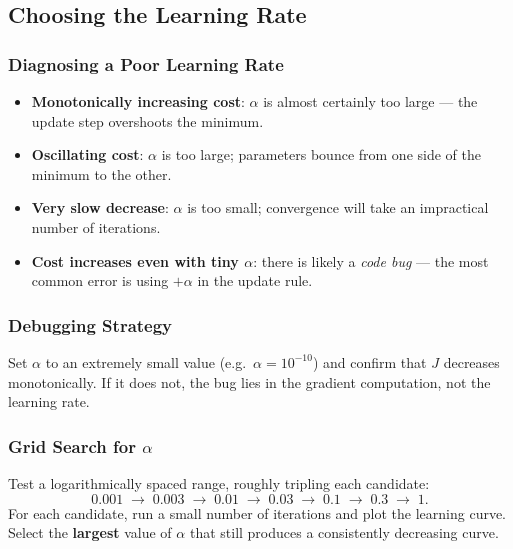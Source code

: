 \subsection{Choosing the Learning Rate}

\subsubsection{Diagnosing a Poor Learning Rate}

\begin{itemize}
\item \textbf{Monotonically increasing cost}: $\alpha$ is almost certainly too
  large — the update step overshoots the minimum.
\item \textbf{Oscillating cost}: $\alpha$ is too large; parameters bounce from
  one side of the minimum to the other.
\item \textbf{Very slow decrease}: $\alpha$ is too small; convergence will take
  an impractical number of iterations.
\item \textbf{Cost increases even with tiny $\alpha$}: there is likely a
  \emph{code bug} — the most common error is using $+\alpha$ in the update rule.
\end{itemize}

\subsubsection{Debugging Strategy}

Set $\alpha$ to an extremely small value (e.g.\ $\alpha=10^{-10}$) and confirm
that $J$ decreases monotonically. If it does not, the bug lies in the gradient
computation, not the learning rate.

\subsubsection{Grid Search for $\alpha$}

Test a logarithmically spaced range, roughly tripling each candidate:
\[
0.001\;\to\;0.003\;\to\;0.01\;\to\;0.03\;\to\;0.1\;\to\;0.3\;\to\;1.
\]
For each candidate, run a small number of iterations and plot the learning
curve. Select the \textbf{largest} value of $\alpha$ that still produces a
consistently decreasing curve.


